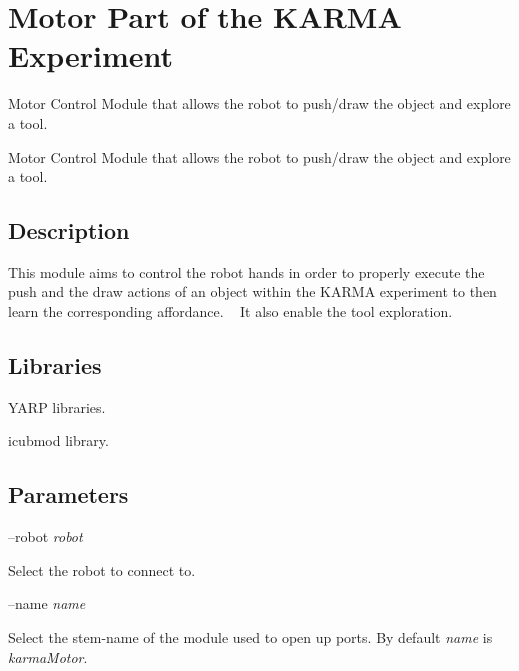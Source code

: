\section{Motor Part of the K\+A\+R\+M\+A Experiment}
\label{group__karmaMotor}


Motor Control Module that allows the robot to push/draw the object and explore a tool.  


Motor Control Module that allows the robot to push/draw the object and explore a tool. 

\hypertarget{group__karmaToolProjection_intro_sec}{}\subsection{Description}\label{group__karmaToolProjection_intro_sec}
This module aims to control the robot hands in order to properly execute the push and the draw actions of an object within the K\+A\+R\+M\+A experiment to then learn the corresponding affordance. ~\newline
 It also enable the tool exploration.\hypertarget{group__karmaToolProjection_lib_sec}{}\subsection{Libraries}\label{group__karmaToolProjection_lib_sec}

\begin{DoxyItemize}
\item Y\+A\+R\+P libraries.
\item icubmod library.
\end{DoxyItemize}\hypertarget{group__karmaToolProjection_parameters_sec}{}\subsection{Parameters}\label{group__karmaToolProjection_parameters_sec}
--robot {\itshape robot} 
\begin{DoxyItemize}
\item Select the robot to connect to.
\end{DoxyItemize}

--name {\itshape name} 
\begin{DoxyItemize}
\item Select the stem-\/name of the module used to open up ports. By default {\itshape name} is {\itshape karma\+Motor}.
\end{DoxyItemize}

